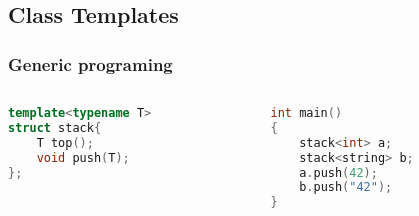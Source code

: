 \documentclass{beamer}
\begin{document}



\subsection{Class Templates}

\begin{frame}[fragile]
    \frametitle{Generic programing}

    \begin{example}
        \footnotesize
        \begin{columns}
            \begin{column}[]{0.4\textwidth}
                \begin{lstlisting}[language=C++]
template<typename T>
struct stack{
    T top();
    void push(T);
};
                \end{lstlisting}

            \end{column}

            \begin{column}[]{0.4\textwidth}
                \begin{lstlisting}[language=C]
int main()
{
    stack<int> a;
    stack<string> b;
    a.push(42);
    b.push("42");
}
\end{lstlisting}
            \end{column}
        \end{columns}
    \end{example}
\end{frame}
\end{document}

